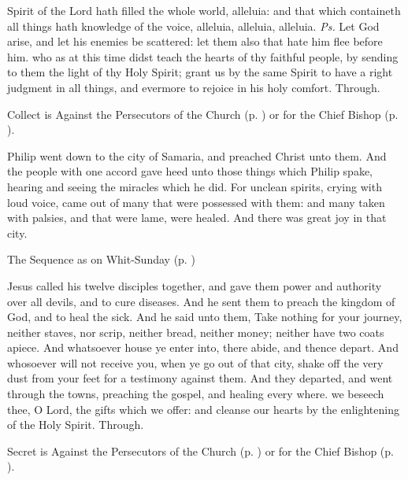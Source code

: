 
\properantiphonfix

\introit
{} Spirit of the Lord hath filled the whole world, alleluia: and that which containeth all things hath knowledge of the voice, alleluia, alleluia, alleluia. \textit{Ps.} Let God arise, and let his enemies be scattered: let them also that hate him flee before him.
\collect
{} who as at this time didst teach the hearts of thy faithful people, by sending to them the light of thy Holy Spirit; grant us by the same Spirit to have a right judgment in all things, and evermore to rejoice in his holy comfort. Through.
\begin{rubric}
     Collect is Against the Persecutors of the Church (p. \pageref{SPAgainst}) or for the Chief Bishop (p. \pageref{SPChiefBishop}).
\end{rubric}
 Philip went down to the city of Samaria, and preached Christ unto them. And the people with one accord gave heed unto those things which Philip spake, hearing and seeing the miracles which he did. For unclean spirits, crying with loud voice, came out of many that were possessed with them: and many taken with palsies, and that were lame, were healed. And there was great joy in that city.
\begin{rubric}
{The Sequence as on Whit-Sunday (p. \pageref{WhitSeq})}
\end{rubric}
 Jesus called his twelve disciples together, and gave them power and authority over all devils, and to cure diseases. And he sent them to preach the kingdom of God, and to heal the sick. And he said unto them, Take nothing for your journey, neither staves, nor scrip, neither bread, neither money; neither have two coats apiece. And whatsoever house ye enter into, there abide, and thence depart. And whosoever will not receive you, when ye go out of that city, shake off the very dust from your feet for a testimony against them. And they departed, and went through the towns, preaching the gospel, and healing every where.
\secret
{} we beseech thee, O Lord, the gifts which we offer: and cleanse our hearts by the enlightening of the Holy Spirit. Through.
\begin{rubric}
     Secret is Against the Persecutors of the Church (p. \pageref{SPAgainst}) or for the Chief Bishop (p. \pageref{SPChiefBishop}).
\end{rubric}

